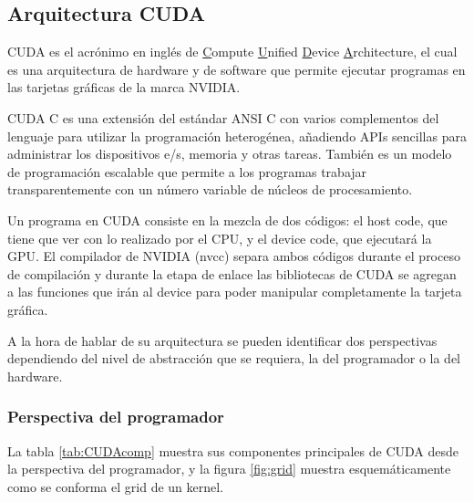     \subsection{Arquitectura CUDA}
    CUDA es el acrónimo en inglés de \underline{C}ompute \underline{U}nified \underline{D}evice \underline{A}rchitecture, el cual es una arquitectura de hardware y de software que permite ejecutar programas en las tarjetas gráficas de la marca NVIDIA\cite{CUDAP}.
    \newline
   
    CUDA C es una extensión del estándar ANSI C con varios complementos del lenguaje para utilizar la programación heterogénea, añadiendo APIs sencillas para administrar los dispositivos e/s, memoria y otras tareas. También es un modelo de programación escalable que permite a los programas trabajar transparentemente con un número variable de núcleos de procesamiento.
    \newline
    
    Un programa en CUDA consiste en la mezcla de dos códigos: el host code, que tiene que ver con lo realizado por el CPU, y el device code, que ejecutará la GPU. El compilador de NVIDIA (nvcc) separa ambos códigos durante el proceso de compilación y durante la etapa de enlace las bibliotecas de CUDA se agregan a las funciones que irán al device para poder manipular completamente la tarjeta gráfica.
    \newline
    
    A la hora de hablar de su arquitectura se pueden identificar dos perspectivas dependiendo del nivel de abstracción que se requiera, la del programador o la del hardware.
        
  \subsubsection{Perspectiva del programador}
   
    La tabla \ref{tab:CUDAcomp} muestra sus componentes principales de CUDA desde la perspectiva del programador, y la figura \ref{fig:grid} muestra esquemáticamente como se conforma el grid de un kernel.
    
